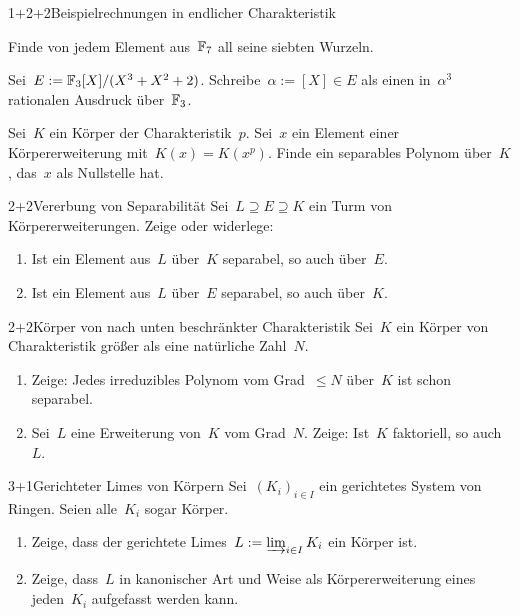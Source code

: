\documentclass{algblatt}
\begin{document}

\begin{aufgabeE}{1+2+2}{Beispielrechnungen in endlicher Charakteristik}
\item Finde von jedem Element aus~$\mathbb{F}_7$ all seine siebten Wurzeln.
\item Sei~$E := \mathbb{F}_3[X]/(X^3 + X^2 + 2)$. Schreibe~$\alpha := [X] \in E$ als einen
in~$\alpha^3$ rationalen Ausdruck über~$\mathbb{F}_3$.
\item Sei~$K$ ein Körper der Charakteristik~$p$. Sei~$x$ ein Element einer
Körpererweiterung mit~$K(x) = K(x^p)$. Finde ein separables Polynom
über~$K$, das~$x$ als Nullstelle hat.
\end{aufgabeE}

\begin{aufgabe}{2+2}{Vererbung von Separabilität}
Sei~$L \supseteq E \supseteq K$ ein Turm von Körpererweiterungen. Zeige oder
widerlege:
\begin{enumerate}
\item Ist ein Element aus~$L$ über~$K$ separabel, so auch über~$E$.
\item Ist ein Element aus~$L$ über~$E$ separabel, so auch über~$K$.
\end{enumerate}
\end{aufgabe}

\begin{aufgabe}{2+2}{Körper von nach unten beschränkter Charakteristik}
Sei~$K$ ein Körper von Charakteristik größer als eine natürliche Zahl~$N$.
\begin{enumerate}
\item Zeige: Jedes irreduzibles Polynom vom Grad~$\leq N$ über~$K$ ist schon
separabel.
\item Sei~$L$ eine Erweiterung von~$K$ vom Grad~$N$.
Zeige: Ist~$K$ faktoriell, so auch~$L$.
\end{enumerate}
\end{aufgabe}

\begin{aufgabe}{3+1}{Gerichteter Limes von Körpern}
Sei~$(K_i)_{i \in I}$ ein gerichtetes System von Ringen. Seien alle~$K_i$ sogar
Körper.
\begin{enumerate}
\item Zeige, dass der gerichtete Limes~$L := \varinjlim_{i \in I} K_i$ ein
Körper ist.
\item Zeige, dass~$L$ in kanonischer Art und Weise als Körpererweiterung eines
jeden~$K_i$ aufgefasst werden kann.
\end{enumerate}
\end{aufgabe}
\end{document}

